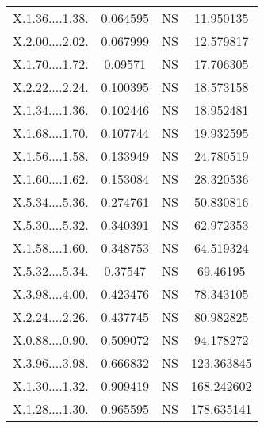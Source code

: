 \documentclass[]{article}
\begin{document}
\begin{longtable}{ c c c c }
X.1.36....1.38. & 0.064595 & NS & 11.950135\\
X.2.00....2.02. & 0.067999 & NS & 12.579817\\
X.1.70....1.72. & 0.09571 & NS & 17.706305\\
X.2.22....2.24. & 0.100395 & NS & 18.573158\\
X.1.34....1.36. & 0.102446 & NS & 18.952481\\
X.1.68....1.70. & 0.107744 & NS & 19.932595\\
X.1.56....1.58. & 0.133949 & NS & 24.780519\\
X.1.60....1.62. & 0.153084 & NS & 28.320536\\
X.5.34....5.36. & 0.274761 & NS & 50.830816\\
X.5.30....5.32. & 0.340391 & NS & 62.972353\\
X.1.58....1.60. & 0.348753 & NS & 64.519324\\
X.5.32....5.34. & 0.37547 & NS & 69.46195\\
X.3.98....4.00. & 0.423476 & NS & 78.343105\\
X.2.24....2.26. & 0.437745 & NS & 80.982825\\
X.0.88....0.90. & 0.509072 & NS & 94.178272\\
X.3.96....3.98. & 0.666832 & NS & 123.363845\\
X.1.30....1.32. & 0.909419 & NS & 168.242602\\
X.1.28....1.30. & 0.965595 & NS & 178.635141   
    \end{longtable}

    \newpage
\end{document}
